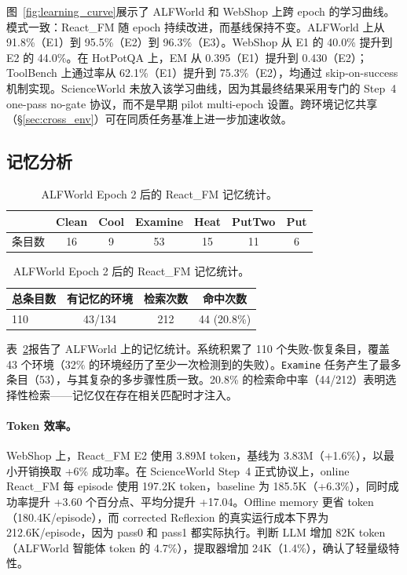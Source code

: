 \documentclass[11pt,a4paper]{article}
\newcommand{\method}{React\_FM}
\begin{document}
图~\ref{fig:learning_curve}展示了 ALFWorld 和 WebShop 上跨 epoch 的学习曲线。模式一致：\method{} 随 epoch 持续改进，而基线保持不变。ALFWorld 上从 91.8\%（E1）到 95.5\%（E2）到 96.3\%（E3）。WebShop 从 E1 的 40.0\% 提升到 E2 的 44.0\%。在 HotPotQA 上，EM 从 0.395（E1）提升到 0.430（E2）；ToolBench 上通过率从 62.1\%（E1）提升到 75.3\%（E2），均通过 skip-on-success 机制实现。ScienceWorld 未放入该学习曲线，因为其最终结果采用专门的 Step~4 one-pass no-gate 协议，而不是早期 pilot multi-epoch 设置。跨环境记忆共享（\S\ref{sec:cross_env}）可在同质任务基准上进一步加速收敛。

\subsection{记忆分析}

\begin{table}[t]
\centering
\caption{ALFWorld Epoch 2 后的 \method{} 记忆统计。}
\label{tab:memory_stats}
\begin{tabular}{lcccccc}
\toprule
 & Clean & Cool & Examine & Heat & PutTwo & Put \\
\midrule
条目数 & 16 & 9 & 53 & 15 & 11 & 6 \\
\bottomrule
\end{tabular}
\vspace{0.5em}

\begin{tabular}{lccc}
\toprule
总条目数 & 有记忆的环境 & 检索次数 & 命中次数 \\
\midrule
110 & 43/134 & 212 & 44 (20.8\%) \\
\bottomrule
\end{tabular}
\end{table}

表~\ref{tab:memory_stats}报告了 ALFWorld 上的记忆统计。系统积累了 110 个失败-恢复条目，覆盖 43 个环境（32\% 的环境经历了至少一次检测到的失败）。\texttt{Examine} 任务产生了最多条目（53），与其复杂的多步骤性质一致。20.8\% 的检索命中率（44/212）表明选择性检索——记忆仅在存在相关匹配时才注入。

\paragraph{Token 效率。} WebShop 上，\method{} E2 使用 3.89M token，基线为 3.83M（+1.6\%），以最小开销换取 +6\% 成功率。在 ScienceWorld Step~4 正式协议上，online \method{} 每 episode 使用 197.2K token，baseline 为 185.5K（+6.3\%），同时成功率提升 +3.60 个百分点、平均分提升 +17.04。Offline memory 更省 token（180.4K/episode），而 corrected Reflexion 的真实运行成本下界为 212.6K/episode，因为 pass0 和 pass1 都实际执行。判断 LLM 增加 82K token（ALFWorld 智能体 token 的 4.7\%），提取器增加 24K（1.4\%），确认了轻量级特性。
\end{document}
